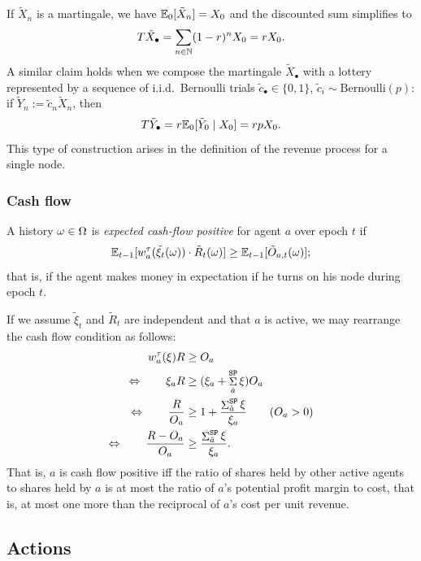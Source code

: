 If $\tilde{X}_n$ is a martingale, we have $\mathbb{E}_0[\tilde{X}_n]=X_0$ and the discounted sum simplifies to 
%
\[
  T\tilde{X}_\bullet = \sum_{n\in\mathbb{N}} (1-r)^n X_0 = rX_0.
\]
%
A similar claim holds when we compose the martingale $\tilde{X}_\bullet$ with a lottery represented by a sequence of i.i.d.~Bernoulli trials $\tilde{c}_\bullet\in\{0,1\}$, $\tilde{c}_i\sim \mathrm{Bernoulli}(p)$: if $\tilde{Y}_n := \tilde{c}_n\tilde{X}_n$, then
%
\[
  T\tilde{Y}_\bullet = r\mathbb{E}_0[\tilde{Y}_0 \mid X_0] = rp X_0.
\]
%
This type of construction arises in the definition of the revenue process for a single node.

\subsubsection{Cash flow}
\label{section:cash-flow}
%
A history $\omega\in\Omega$ is \emph{expected cash-flow positive} for agent $a$ over epoch $t$ if 
%
\[
  \mathbb{E}_{t-1}[w_a^\tau(\tilde \xi_t(\omega))\cdot \tilde{R}_t(\omega)] \geq \mathbb{E}_{t-1}[ \tilde{O}_{a,t}(\omega)];
\]
%
that is, if the agent makes money in expectation if he turns on his node during epoch $t$.

If we assume $\tilde\xi_t$ and $\tilde{R}_t$ are independent and that $a$ is active, we may rearrange the cash flow condition as follows:
\begin{align*}
  w_a^\tau(\xi) R & \geq O_a \\
  \Leftrightarrow \qquad \xi_a R &\geq (\xi_a+\mathop{\Sigma}^{\mathtt{SP}}_{\hat{a}}\xi)O_a \\
  \Leftrightarrow \qquad \frac {R}{O_a} &\geq 1 + \frac{\mathop{\Sigma}^{\mathtt{SP}}_{\hat{a}}\xi}{\xi_a}  \qquad (O_a>0)\\
  \Leftrightarrow \qquad \frac { R-O_a } {O_a} &\geq \frac{\mathop{\Sigma}^{\mathtt{SP}}_{\hat{a}}\xi}{\xi_a} .
\end{align*}
%
That is, $a$ is cash flow positive iff the ratio of shares held by other active agents to shares held by $a$ is at most the ratio of $a$'s potential profit margin to cost, that is, at most one more than the reciprocal of $a$'s cost per unit revenue.

\subsection{Actions}
\label{section:actions}

